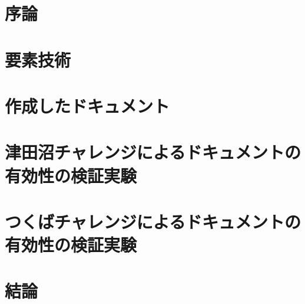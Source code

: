 \chapter{序論}
\label{chap:introduction}
%
%
%

\chapter{要素技術}

\chapter{作成したドキュメント}

\chapter{津田沼チャレンジによるドキュメントの有効性の検証実験}

\chapter{つくばチャレンジによるドキュメントの有効性の検証実験}

\chapter{結論}
